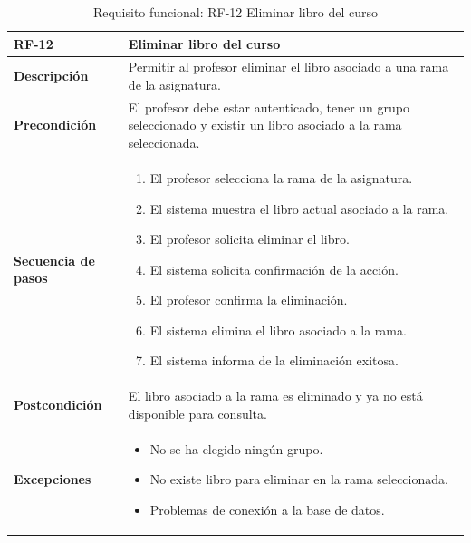 \begin{table}[H]
\centering
\begin{tabularx}{\textwidth}{
  |>{\centering\arraybackslash}l
  |>{\centering\arraybackslash}X|}
\hline
\textbf{RF-12} & \textbf{Eliminar libro del curso} \\ \hline

\textbf{Descripción} & Permitir al profesor eliminar el libro asociado a una rama de la asignatura. \\ \hline

\textbf{Precondición} & El profesor debe estar autenticado, tener un grupo seleccionado y existir un libro asociado a la rama seleccionada. \\ \hline

\textbf{Secuencia de pasos} & 
\begin{enumerate}
  \item El profesor selecciona la rama de la asignatura.
  \item El sistema muestra el libro actual asociado a la rama.
  \item El profesor solicita eliminar el libro.
  \item El sistema solicita confirmación de la acción.
  \item El profesor confirma la eliminación.
  \item El sistema elimina el libro asociado a la rama.
  \item El sistema informa de la eliminación exitosa.
\end{enumerate} \\ \hline

\textbf{Postcondición} & El libro asociado a la rama es eliminado y ya no está disponible para consulta. \\ \hline

\textbf{Excepciones} & 
\begin{itemize}
  \item No se ha elegido ningún grupo.
  \item No existe libro para eliminar en la rama seleccionada.
  \item Problemas de conexión a la base de datos.
\end{itemize} \\ \hline
\end{tabularx}
\caption{Requisito funcional: RF-12 Eliminar libro del curso}
\end{table}
